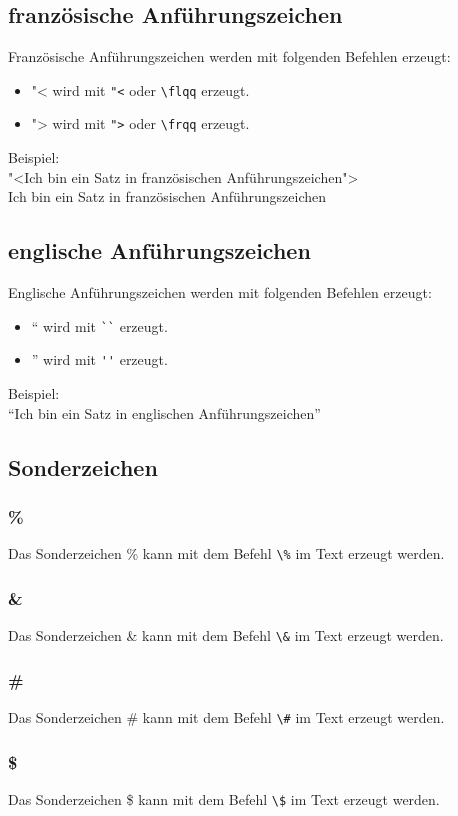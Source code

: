 \documentclass[
12pt,
ngerman
]{scrreprt}
\begin{document}
\subsection{französische Anführungszeichen}
Französische Anführungszeichen werden mit folgenden Befehlen erzeugt: \\
\begin{itemize}
  \item "< wird mit \verb!"<! oder \verb!\flqq! erzeugt.
  \item "> wird mit \verb!">! oder \verb!\frqq! erzeugt.
\end{itemize}
Beispiel: \\
"<Ich bin ein Satz in französischen Anführungszeichen"> \\
\flqq Ich bin ein Satz in französischen Anführungszeichen\frqq
\subsection{englische Anführungszeichen}
Englische Anführungszeichen werden mit folgenden Befehlen erzeugt: \\
\begin{itemize}
  \item `` wird mit \verb!``! erzeugt.
  \item '' wird mit \verb!''! erzeugt.
\end{itemize}
Beispiel: \\
``Ich bin ein Satz in englischen Anführungszeichen''
\subsection{Sonderzeichen}
\subsubsection{\%}
Das Sonderzeichen \% kann mit dem Befehl \verb!\%! im Text erzeugt werden.
\subsubsection{\&}
Das Sonderzeichen \& kann mit dem Befehl \verb!\&! im Text erzeugt werden.
\subsubsection{\#}
Das Sonderzeichen \# kann mit dem Befehl \verb!\#! im Text erzeugt werden.
\subsubsection{\$}
Das Sonderzeichen \$ kann mit dem Befehl \verb!\$! im Text erzeugt werden.
\end{document}
